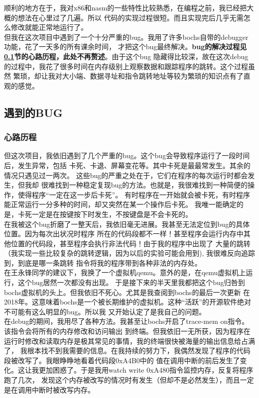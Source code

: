 \documentclass[a4paper]{article}
\begin{document}
    顺利的地方在于，我对x86和nasm的一些特性比较熟悉，在编程之前，我已经把大概的想法在心里过了几遍。所以
    代码的实现过程很短。而且实现完后几乎无需怎么修改就能正常地运行了。\\
    
    但我在这次项目中遇到了一个十分严重的bug。我用了许多bochs自带的debugger功能，花了一天多的所有课余时间，
    才把这个bug最终解决。\textbf{bug的解决过程见\ref{sec:bug}节的心路历程，此处不再赘述}。由于这个bug
    隐藏得比较深，故在这次debug的过程中，我花了很多时间在内存级别上观察数据和跟踪程序的跳转。这个过程虽然
    繁琐，却让我对大小端、数据寻址和指令跳转地址等较为繁琐的知识点有了直观的感觉。

    \subsection{遇到的BUG} \label{sec:bug}
        \subsubsection{心路历程}
    但这次项目，我依旧遇到了几个严重的bug。这个bug会导致程序运行了一段时间后，发生异常，包括
    卡死、卡退、屏幕变花等。其中卡死是最最常发生。其余的情况只遇见过一两次。
    这些bug的严重之处在于，它们在程序的每次运行时都会发生，但我却
    很难找到一种稳定复现bug的方法。也就是，我很难找到一种简便的操作，使得程序``一定在这一步后卡死''。
    有时程序在一开始就会被卡死，有时程序能正常运行一分多种的时间，却又突然在某一个操作后卡死。
    我唯一能确定的是，卡死一定是在按键按下时发生，不按键盘是不会卡死的。\\
    
    在我被这个bug折磨了一整天后，我依旧毫无进展。我甚至无法定位到bug的具体位置。因为每次出状况时程序
    所在的代码段都不一样！甚至程序会运行内存中其他位置的代码段，甚至程序会执行非法代码！由于我的程序中出现了
    大量的跳转（我实现一些比较复杂的跳转逻辑，因为以后的实验可能会用到), 我很难反向追踪到，到底是哪一条跳转
    指令将我的程序带到各种非法的内存处。\\
    
    在王永锋同学的建议下，我换了一个虚拟机qemu。意外的是，在qemu虚拟机上运行，这个bug居然一次都没有出现。
    于是接下来的半天里我都把这个bug归咎到bochs虚拟机的头上。但我依旧不死心。尤其是我查阅到bochs的最后一次更新
    在2018年。这意味着bochs是一个被长期维护的虚拟机。这种``活跃''的开源软件绝对不可能有这么明显的bug。所以我
    又开始认定了是我自己的问题。\\
    
    在debug的期间，我用尽了各种方法。我甚至让bochs开启了trace-mem on指令。该指令会将所有的内存修改和访问输出
    到终端。但我依旧一无所获，因为程序在运行时修改和读取内存是极其常见的事情，我的终端很快被海量的输出信息给占满了，
    我根本找不到我需要的信息。在我持续的努力下，我偶然发现了程序的代码段被改写了。我眼睁睁地看着代码段0xA4B0中的
    值在调用中断的前后发生了变化。这让我更加困惑了。于是我用watch write 0xA480指令监控内存，反复将程序跑了几次，
    发现这个内存被改写的情况时有发生（但却不是必然发生），而且一定是在调用中断时被改写内存。\\
    
\end{document}

